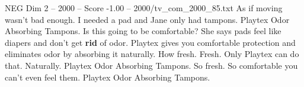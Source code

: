 \begin{textsample}{NEG Dim 2 – 2000 – Score -1.00 – 2000/tv\_com\_2000\_85.txt}  \label{ex:f2_neg_016}
As if moving wasn't bad enough.
I needed a pad and Jane only had tampons.
Playtex Odor Absorbing Tampons.
Is this going to be comfortable?
She says pads feel like diapers and don't get \textbf{rid} of odor.
Playtex gives you comfortable protection and eliminates odor by absorbing it naturally.
How fresh.
Fresh.
Only Playtex can do that.
Naturally.
Playtex Odor Absorbing Tampons.
So fresh.
So comfortable you can't even feel them.
Playtex Odor Absorbing Tampons.

\end{textsample}
